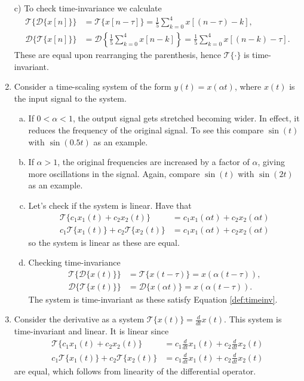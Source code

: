 \begin{enumerate}
\item[c)] To check time-invariance we calculate
\begin{align*}
    \mathcal{T}\{\mathcal{D}\{x[n]\}\}&=\mathcal{T}\{x[n-\tau]\}=\frac{1}{5}\sum_{k=0}^{4}x[(n-\tau)-k], \\
    \mathcal{D}\{\mathcal{T}\{x[n]\}\}&=\mathcal{D}\left\{\frac{1}{5}\sum_{k=0}^{4}x[n-k]\right\}=\frac{1}{5}\sum_{k=0}^{4}x[(n-k)-\tau].
\end{align*}
These are equal upon rearranging the parenthesis, hence $\mathcal{T}\{\cdot\}$ is time-invariant. 

\item Consider a time-scaling system of the form $y(t)=x(\alpha t)$, where $x(t)$ is the input signal to the system. 

\begin{enumerate}[a)]
\item If $0<\alpha<1$, the output signal gets stretched becoming wider. In effect, it reduces the frequency of the original signal. To see this compare $\sin(t)$ with $\sin(0.5t)$ as an example. 

\item If $\alpha>1$, the original frequencies are increased by a factor of $\alpha$, giving more oscillations in the signal. Again, compare $\sin(t)$ with $\sin(2t)$ as an example.

\item Let's check if the system is linear. Have that
\begin{align*}
    \mathcal{T}\{c_{1}x_{1}(t)+c_{2}x_{2}(t)\}&= c_{1}x_{1}(\alpha t) + c_{2}x_{2}(\alpha t) \\
    c_{1}\mathcal{T}\{x_{1}(t)\}+c_{2}\mathcal{T}\{x_{2}(t)\}&=c_{1}x_{1}(\alpha t)+c_{2}x_{2}(\alpha t)
\end{align*}
so the system is linear as these are equal.

\item Checking time-invariance
\begin{align*}
    \mathcal{T}\{\mathcal{D}\{x(t)\}\}&=\mathcal{T}\{x(t-\tau)\}=x(\alpha(t-\tau)), \\
    \mathcal{D}\{\mathcal{T}\{x(t)\}\}&=\mathcal{D}\{x(\alpha t)\}=x(\alpha(t-\tau)).
\end{align*}
The system is time-invariant as these satisfy Equation \ref{def:timeinv}.
\end{enumerate}

\item Consider the derivative as a system $\mathcal{T}\{x(t)\}=\frac{d}{dt}x(t)$. This system is time-invariant and linear. It is linear since
\begin{align*}
    \mathcal{T}\{c_{1}x_{1}(t)+c_{2}x_{2}(t)\}&=c_{1}\frac{d}{dt}x_{1}(t) + c_{2}\frac{d}{dt}x_{2}(t) \\
    c_{1}\mathcal{T}\{x_{1}(t)\}+c_{2}\mathcal{T}\{x_{2}(t)\}&=c_{1}\frac{d}{dt}x_{1}(t) + c_{2}\frac{d}{dt}x_{2}(t)
\end{align*}
are equal, which follows from linearity of the differential operator.


\end{enumerate}
